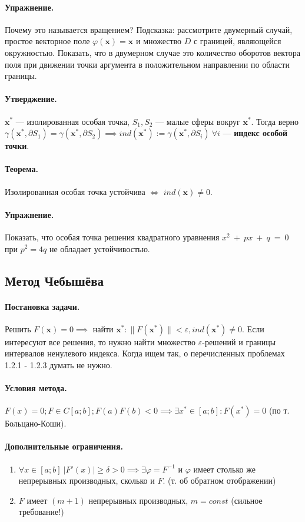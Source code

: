 \paragraph{Упражнение.} Почему это называется вращением? Подсказка: рассмотрите двумерный случай, простое векторное поле $\varphi(\mathbf{x}) = \mathbf{x}$ и множество $D$ с границей, являющейся окружностью. Показать, что в двумерном случае это количество оборотов вектора поля при движении точки аргумента в положительном направлении по области границы.
\paragraph{Утверджение.} $\mathbf{x}^*$ --- изолированная особая точка, $S_1, S_2$ --- малые сферы вокруг $\mathbf{x}^*$. Тогда верно $\gamma(\mathbf{x}^*, \partial S_1) = \gamma(\mathbf{x}^*, \partial S_2) \implies ind(\mathbf{x}^*) := \gamma(\mathbf{x}^*, \partial S_i) \ \forall i$ --- \textbf{индекс особой точки}.
\paragraph{Теорема.} Изолированная особая точка устойчива $\iff$ $ind(\mathbf{x}) \neq 0$.
\paragraph{Упражнение.} Показать, что особая точка решения квадратного уравнения $x^2~+~px~+~q~=~0$ при $p^2=4q$ не обладает устойчивостью.
\subsection{Метод Чебышёва}
\paragraph{Постановка задачи.}
Решить $F(\mathbf{x}) = 0 \implies$ найти $\mathbf{x}^*: \|F(\mathbf{x}^*)\|<\varepsilon, ind(\mathbf{x}^*) \neq 0$.
Если интересуют все решения, то нужно найти множество $\varepsilon$-решений и границы интервалов ненулевого индекса.
Когда ищем так, о перечисленных проблемах 1.2.1 - 1.2.3 думать не нужно.
\paragraph{Условия метода.}
$F(x)=0; F \in C[a; b]; F(a)F(b) < 0 \implies \exists x^* \in [a; b]: F(x^*)=0$ (по т. Больцано-Коши).

\paragraph{Дополнительные ограничения.}
\begin{enumerate}
	\item $\forall x \in [a; b]\ \left| F'(x) \right| \ge \delta > 0 \implies \exists \varphi = F^{-1}$ и $\varphi$ имеет столько же непрерывных производных, сколько и $F$. (т. об обратном отображении)
	\item $F$ имеет $(m+1)$ непрерывных производных, $m = const$ (сильное требование!)
\end{enumerate}
